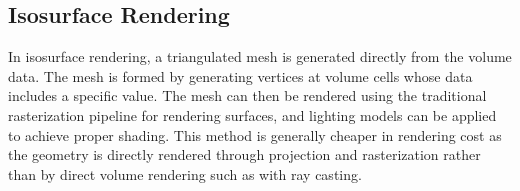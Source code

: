\documentclass{article}
\begin{document}
\subsection{Isosurface Rendering}
In isosurface rendering, a triangulated mesh is generated directly from the volume data.
The mesh is formed by generating vertices at volume cells whose data includes a specific value.
The mesh can then be rendered using the traditional rasterization pipeline for rendering surfaces, and 
lighting models can be applied to achieve proper shading. This method is generally cheaper in rendering cost as the
geometry is directly rendered through projection and rasterization rather than by direct volume rendering such as with
ray casting.




\end{document}
